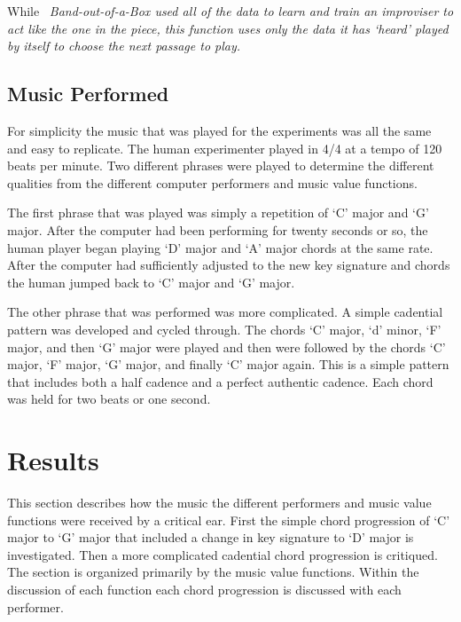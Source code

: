 \documentclass[12pt]{ucthesis}
\begin{document}
While ~\em{Band-out-of-a-Box }\em used all of the data to learn and train an improviser to act like the one in the piece, this function uses only the data it has `heard' played by itself to choose the next passage to play. 

\section{Music Performed}
\label{music-performed}
For simplicity the music that was played for the experiments was all the same and easy to replicate. The human experimenter played in 4/4 at a tempo of 120 beats per minute. Two different phrases were played to determine the different qualities from the different computer performers and music value functions. 

The first phrase that was played was simply a repetition of `C' major and `G' major. After the computer had been performing for twenty seconds or so, the human player began playing `D' major and `A' major chords at the same rate. After the computer had sufficiently adjusted to the new key signature and chords the human jumped back to `C' major and `G' major. 

The other phrase that was performed was more complicated. A simple cadential pattern was developed and cycled through. The chords `C' major, `d' minor, `F' major, and then `G' major were played and then were followed by the chords `C' major, `F' major, `G' major, and finally `C' major again. This is a simple pattern that includes both a half cadence and a perfect authentic cadence. Each chord was held for two beats or one second.

\chapter{Results}
\label{results}
This section describes how the music the different performers and music value functions were received by a critical ear. First the simple chord progression of `C' major to `G' major that included a change in key signature to `D' major is investigated. Then a more complicated cadential chord progression is critiqued. The section is organized primarily by the music value functions. Within the discussion of each function each chord progression is discussed with each performer. 
\end{document}
